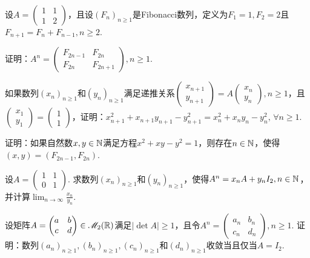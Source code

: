 \begin{problem}
  设$A=\begin{pmatrix}
    1 & 1 \\
    1 & 2
  \end{pmatrix}$，且设$(F_n)_{n\ge1}$是Fibonacci数列，定义为$F_1=1,F_2=2$且$F_{n+1}=F_n+F_{n-1},n\ge2$.
  \begin{enum}
    \item 证明：$A^n=\begin{pmatrix}
      F_{2n-1} & F_{2n} \\
      F_{2n} & F_{2n+1}
    \end{pmatrix},n\ge1$.
    \item 如果数列$(x_n)_{n\ge1}$和$(y_n)_{n\ge1}$满足递推关系$\begin{pmatrix}
          x_{n+1} \\ y_{n+1}
        \end{pmatrix}=A\begin{pmatrix}
          x_n \\ y_n
        \end{pmatrix},n\ge1$，且$\begin{pmatrix}
          x_1 \\ y_1
        \end{pmatrix}=\begin{pmatrix}
          1 \\ 1
        \end{pmatrix}$，证明：$x_{n+1}^2+x_{n+1}y_{n+1}-y_{n+1}^2=x_n^2+x_ny_n
        -y_n^2,\,\forall n\ge1$.
    \item 证明：如果自然数$x,y\in\mathbb N$满足方程$x^2+xy-y^2=1$，则存在$n\in\mathbb N$，使得$(x,y)=(F_{2n-1},F_{2n})$.
  \end{enum}
\end{problem}

\begin{problem}
  设$A=\begin{pmatrix}
    1 & 1 \\
    0 & 1
  \end{pmatrix}$. 求数列$(x_n)_{n\ge1}$和$(y_n)_{n\ge1}$，使得$A^n=x_nA+y_nI_2,n\in\mathbb N$，并计算$\lim_{n\to\infty}\frac{x_n}{y_n}$.
\end{problem}

\begin{problem}
  设矩阵$A=\begin{pmatrix}
    a & b \\
    c & d
  \end{pmatrix}\in\mathscr M_2(\mathbb R)$满足$|\det A|\ge1$，且令$A^n=\begin{pmatrix}
    a_n & b_n \\
    c_n & d_n
  \end{pmatrix},n\ge1$. 证明：数列$(a_n)_{n\ge1},(b_n)_{n\ge1},(c_n)_{n\ge1}$和$(d_n)_{n\ge1}$收敛当且仅当$A=I_2$.
\end{problem}

